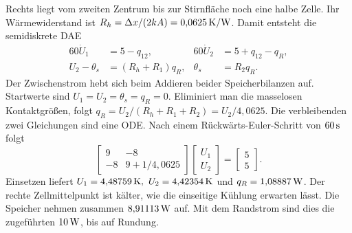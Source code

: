 Rechts liegt vom zweiten Zentrum bis zur Stirnfläche noch eine halbe Zelle. Ihr Wärmewiderstand ist \(R_h=\Delta x/(2kA)=0{,}0625\,\mathrm{K/W}\). Damit entsteht die semidiskrete DAE
\[
 \begin{aligned}
 60\dot U_1&=5-q_{12},& 60\dot U_2&=5+q_{12}-q_R,\\
 U_2-\theta_s&=(R_h+R_1)q_R,& \theta_s&=R_2q_R .
 \end{aligned}
\]
Der Zwischenstrom hebt sich beim Addieren beider Speicherbilanzen auf. Startwerte sind \(U_1=U_2=\theta_s=q_R=0\). Eliminiert man die masselosen Kontaktgrößen, folgt \(q_R=U_2/(R_h+R_1+R_2)=U_2/4{,}0625\). Die verbleibenden zwei Gleichungen sind eine ODE.
Nach einem Rückwärts-Euler-Schritt von \(60\,\mathrm{s}\) folgt
\[
 \begin{bmatrix}9&-8\\-8&9+1/4{,}0625\end{bmatrix}
 \begin{bmatrix}U_1\\U_2\end{bmatrix}=\begin{bmatrix}5\\5\end{bmatrix}.
\]
Einsetzen liefert \(U_1=4{,}48759\unitm K,\ U_2=4{,}42354\unitm K\) und \(q_R=1{,}08887\,\mathrm{W}\). Der rechte Zellmittelpunkt ist kälter, wie die einseitige Kühlung erwarten lässt. Die Speicher nehmen zusammen \(8{,}91113\,\mathrm{W}\) auf. Mit dem Randstrom sind dies die zugeführten \(10\,\mathrm{W}\), bis auf Rundung.

